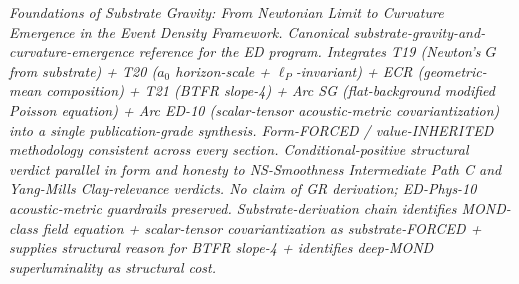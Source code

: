 \documentclass[
]{article}
\begin{document}
\emph{Foundations of Substrate Gravity: From Newtonian Limit to
Curvature Emergence in the Event Density Framework. Canonical
substrate-gravity-and-curvature-emergence reference for the ED program.
Integrates T19 (Newton's \(G\) from substrate) + T20 (\(a_0\)
horizon-scale + \(\ell_P\)-invariant) + ECR (geometric-mean composition)
+ T21 (BTFR slope-4) + Arc SG (flat-background modified Poisson
equation) + Arc ED-10 (scalar-tensor acoustic-metric covariantization)
into a single publication-grade synthesis. Form-FORCED / value-INHERITED
methodology consistent across every section. Conditional-positive
structural verdict parallel in form and honesty to NS-Smoothness
Intermediate Path C and Yang-Mills Clay-relevance verdicts. No claim of
GR derivation; ED-Phys-10 acoustic-metric guardrails preserved.
Substrate-derivation chain identifies MOND-class field equation +
scalar-tensor covariantization as substrate-FORCED + supplies structural
reason for BTFR slope-4 + identifies deep-MOND superluminality as
structural cost.}
\end{document}
